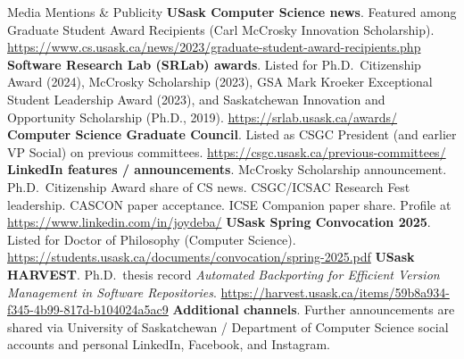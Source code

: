 \begin{rubric}{Media Mentions \& Publicity}
\entry*[2023]%
	\textbf{USask Computer Science news}. Featured among Graduate Student Award Recipients (Carl McCrosky Innovation Scholarship).
	\url{https://www.cs.usask.ca/news/2023/graduate-student-award-recipients.php}
\vspace{-1mm}
\entry*[Lab]%
	\textbf{Software Research Lab (SRLab) awards}. Listed for Ph.D.\ Citizenship Award (2024), McCrosky Scholarship (2023), GSA Mark Kroeker Exceptional Student Leadership Award (2023), and Saskatchewan Innovation and Opportunity Scholarship (Ph.D., 2019).
	\url{https://srlab.usask.ca/awards/}
\vspace{-1mm}
\entry*[CSGC]%
	\textbf{Computer Science Graduate Council}. Listed as CSGC President (and earlier VP Social) on previous committees.
	\url{https://csgc.usask.ca/previous-committees/}
\vspace{-1mm}
\entry*[LinkedIn]%
	\textbf{LinkedIn features / announcements}. McCrosky Scholarship announcement. Ph.D.\ Citizenship Award share of CS news. CSGC/ICSAC Research Fest leadership. CASCON paper acceptance. ICSE Companion paper share.
	Profile at \url{https://www.linkedin.com/in/joydeba/}
\vspace{-1mm}
\entry*[Thesis]%
	\textbf{USask Spring Convocation 2025}. Listed for Doctor of Philosophy (Computer Science).
	\url{https://students.usask.ca/documents/convocation/spring-2025.pdf}
\vspace{-1mm}
\entry*[HARVEST]%
	\textbf{USask HARVEST}. Ph.D.\ thesis record \emph{Automated Backporting for Efficient Version Management in Software Repositories}.
	\url{https://harvest.usask.ca/items/59b8a934-f345-4b99-817d-b104024a5ac9}
\vspace{-1mm}
\entry*[Social]%
	\textbf{Additional channels}. Further announcements are shared via University of Saskatchewan / Department of Computer Science social accounts and personal LinkedIn, Facebook, and Instagram.
\end{rubric}
